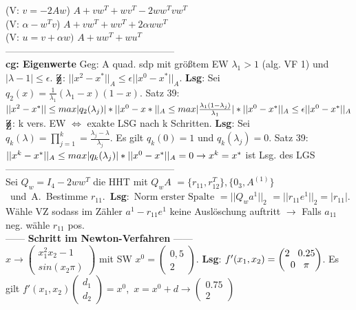 (V: $v = -2Aw$) $A + vw^T + wv^T - 2ww^Tvw^T$\\
(V: $\alpha -w^Tv$) $A + vw^T + wv^T + 2\alpha ww^T$\\
(V: $u = v + \alpha w)$ $A + uw^T + wu^T$\\
-----------------------------------------------------\\
\textbf{cg: Eigenwerte} Geg: A quad. sdp mit größtem EW $\lambda_1 > 1$ (alg. VF 1) und $|\lambda - 1| \leq \epsilon$. $\mathrm{Z\kern-.6em\raise-0.7ex\hbox{Z}}$: $||x^2 - x^*||_A \leq \epsilon||x^0 - x^*||_A$. \textbf{Lsg}: Sei $q_2(x) = \frac{1}{\lambda_1}(\lambda_1 - x)(1-x)$. Satz 39: $||x^2 - x^*|| \leq max|q_2(\lambda_j)|*||x^0 - x*||_A \\
\leq max |\frac{\lambda_1(1-\lambda_j)}{\lambda_1}|*||x^0 - x^*||_A \leq \epsilon||x^0 - x^*||_A$\\
$\mathrm{Z\kern-.6em\raise-0.7ex\hbox{Z}}$: k vers. EW $\Leftrightarrow$ exakte LSG nach k Schritten. \textbf{Lsg}: Sei $q_k(\lambda) = \prod_{j = 1}^k = \frac{\lambda_j - \lambda}{\lambda_j}$. Es gilt $q_k(0) = 1$ und $q_k(\lambda_j) = 0$. Satz 39: $||x^k - x^*||_A \leq max|q_k(\lambda_j)|*||x^0 - x^*||_A \\ = 0 \rightarrow x^k = x^*$ ist Lsg. des LGS\\
-----------------------------------------------------\\
Sei $Q_w = I_4 - 2ww^T$ die HHT mit 
$Q_wA $ \mbox{$= \{r_{11} , r_{12}^T \}, \{0_3 , A^{(1)}\}$ und A. Bestimme} \mbox{$r_{11}$. \textbf{Lsg}: $\text{Norm erster Spalte } = ||Q_wa^1||_2$} $ = ||r_{11}e^1||_2 = |r_{11}|$. Wähle VZ sodass im Zähler $a^1 - r_{11}e^1$ keine Auslöschung auftritt $\rightarrow$ Falls $a_{11}$ neg. wähle $r_{11}$ pos.\\
------ \textbf{Schritt im Newton-Verfahren} ------\\
$x \rightarrow \begin{pmatrix} x_1^2 x_2 - 1 \\ sin(x_2 \pi) \end{pmatrix}$ mit SW $x^0 = \begin{pmatrix} 0,5 \\ 2 \end{pmatrix}$. \textbf{Lsg}: $f'(x_1,x_2) = \begin{pmatrix} 2 \hspace*{3mm} 0.25\\0 \hspace*{3mm} \pi \end{pmatrix}$. Es gilt \mbox{$f'(x_1,x_2) \begin{pmatrix} d_1 \\ d_2 \end{pmatrix} = x^0$, $x = x^0 + d \rightarrow \begin{pmatrix} 0.75 \\ 2\end{pmatrix}$}\\
